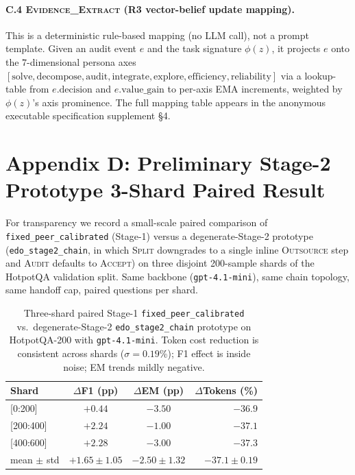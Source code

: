 \paragraph{C.4 \textsc{Evidence\_Extract} (R3 vector-belief update mapping).}
This is a deterministic rule-based mapping (no LLM call), not a prompt template. Given an audit event $e$ and the task signature $\phi(z)$, it projects $e$ onto the $7$-dimensional persona axes $[\text{solve}, \text{decompose}, \text{audit}, \text{integrate}, \text{explore}, \text{efficiency}, \text{reliability}]$ via a lookup-table from $e.\text{decision}$ and $e.\text{value\_gain}$ to per-axis EMA increments, weighted by $\phi(z)$'s axis prominence. The full mapping table appears in the anonymous executable specification supplement \S 4.

\section*{Appendix D: Preliminary Stage-2 Prototype 3-Shard Paired Result}
\label{sec:appendix-d}

For transparency we record a small-scale paired comparison of \texttt{fixed\_peer\_calibrated} (Stage-1) versus a degenerate-Stage-2 prototype (\texttt{edo\_stage2\_chain}, in which \textsc{Split} downgrades to a single inline \textsc{Outsource} step and \textsc{Audit} defaults to \textsc{Accept}) on three disjoint 200-sample shards of the HotpotQA validation split. Same backbone (\texttt{gpt-4.1-mini}), same chain topology, same handoff cap, paired questions per shard.

\begin{table}[h]
\centering
\small
\setlength{\tabcolsep}{3pt}
\begin{tabular}{@{}lccr@{}}
\toprule
\textbf{Shard} & $\Delta$F1 (pp) & $\Delta$EM (pp) & $\Delta$Tokens (\%) \\
\midrule
{[0:200]}     & $+0.44$ & $-3.50$ & $-36.9$ \\
{[200:400]}   & $+2.24$ & $-1.00$ & $-37.1$ \\
{[400:600]}   & $+2.28$ & $-3.00$ & $-37.3$ \\
\midrule
mean $\pm$ std & $+1.65 \pm 1.05$ & $-2.50 \pm 1.32$ & $-37.1 \pm 0.19$ \\
\bottomrule
\end{tabular}
\caption{Three-shard paired Stage-1 \texttt{fixed\_peer\_calibrated} vs.\ degenerate-Stage-2 \texttt{edo\_stage2\_chain} prototype on HotpotQA-200 with \texttt{gpt-4.1-mini}. Token cost reduction is consistent across shards ($\sigma{=}0.19$\%); F1 effect is inside noise; EM trends mildly negative.}
\label{tab:appendix-d-shard}
\end{table}


